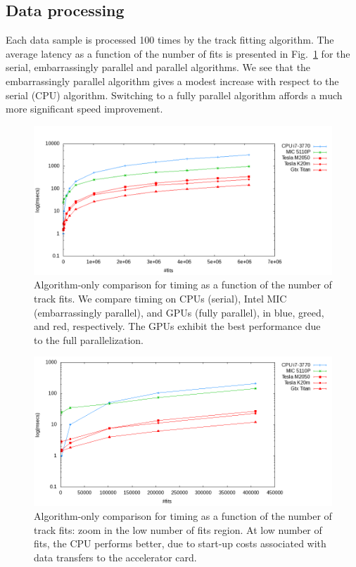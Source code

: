 \documentclass[journal]{IEEEtran}
\begin{document}
\subsection{Data processing}
Each data sample is processed 100 times by the track fitting algorithm. 
The average latency as a function of the number of fits is presented in 
Fig.~\ref{fig:algo_only_timing} for the serial,
embarrassingly parallel and parallel algorithms. We see that the
embarrassingly parallel algorithm gives a modest increase with respect
to the serial (CPU) algorithm. Switching to a fully parallel algorithm
affords a much more significant speed improvement. 
\begin{figure}[!t]
  \centering
  \includegraphics[width=0.9\linewidth]{figures/TimeComp_MIC}
  \caption{Algorithm-only comparison for timing as a function of the
    number of track fits. We compare timing on CPUs (serial), Intel
    MIC (embarrassingly parallel), and GPUs (fully parallel), in
    blue, greed, and red, respectively. The GPUs exhibit the best
    performance due to the full parallelization. }
  \label{fig:algo_only_timing}
\end{figure}
\begin{figure}[!t]
  \centering
  \includegraphics[width=0.9\linewidth]{figures/TimeCompZoom_MIC.png} 
  \caption{Algorithm-only comparison for timing as a function of the
    number of track fits: zoom in the low number of fits region. At
    low number of fits, the CPU performs better, due to start-up
    costs associated with data transfers to the accelerator card.}
  \label{fig:algo_only_timing_zoom}
\end{figure}
\end{document}
